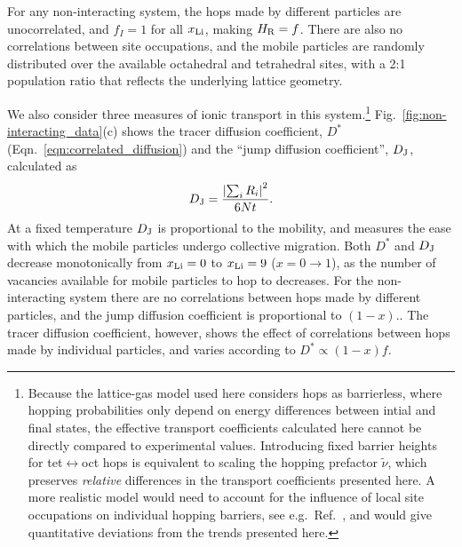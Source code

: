 \documentclass[aps,prb,twocolumn,superscriptaddress,reprint]{revtex4-1}
\newcommand{\xLi}{x_\m{Li}}
\newcommand{\hrpa}{{\widetilde{\nu}}}
\begin{document}
For any non-interacting system, the hops made by different particles are unocorrelated, and $f_I=1$ for all $\xLi$, making $H_{\mathrm{R}}=f$. 
There are also no correlations between site occupations, and the mobile particles are randomly distributed over the available octahedral and tetrahedral sites, with a 2:1 population ratio that reflects the underlying lattice geometry.

We also consider three measures of ionic transport in this system.\footnote{Because the lattice-gas model used here considers hops as barrierless, where hopping probabilities only depend on  energy differences between intial and final states, the effective transport coefficients calculated here cannot be directly compared to experimental values. 
Introducing fixed barrier heights for tet$\leftrightarrow$oct hops is equivalent to scaling the hopping prefactor $\hrpa$, which preserves \emph{relative} differences in the transport coefficients presented here. 
A more realistic model would need to account for the influence of local site occupations on individual hopping barriers, see e.g.\ Ref.\ \cite{VanderVenAndCeder_HandbookofMaterialsModelling2010}, and would give quantitative deviations from the trends presented here.} Fig.~\ref{fig:non-interacting_data}(c) shows the tracer diffusion coefficient, $D^*$ (Eqn.~\ref{eqn:correlated_diffusion}) and the ``jump diffusion coefficient'', $D_{\mathrm{J}}$\cite{VanDerVenEtAl_AccChemRes2013}, calculated as
\begin{equation}
  D_{\mathrm{J}}=\frac{\left|\sum_iR_i\right|^2}{6Nt}.
\end{equation}
At a fixed temperature $D_{\mathrm{J}}$ is proportional to the mobility, and measures the ease with which the mobile particles undergo collective migration. 
Both $D^*$ and $D_{\mathrm{J}}$ decrease monotonically from $\xLi=0$ to $\xLi=9$ ($x=0\to1$), as the number of vacancies available for mobile particles to hop to decreases. 
For the non-interacting system there are no correlations between hops made by different particles, and the jump diffusion coefficient is proportional to $(1-x)$.\cite{Kutner_PhysLett1981,VanDerVenEtAl_AccChemRes2013}. 
The tracer diffusion coefficient, however, shows the effect of correlations between hops made by individual particles, and varies according to $D^*\propto(1-x)f$. 
\end{document}
